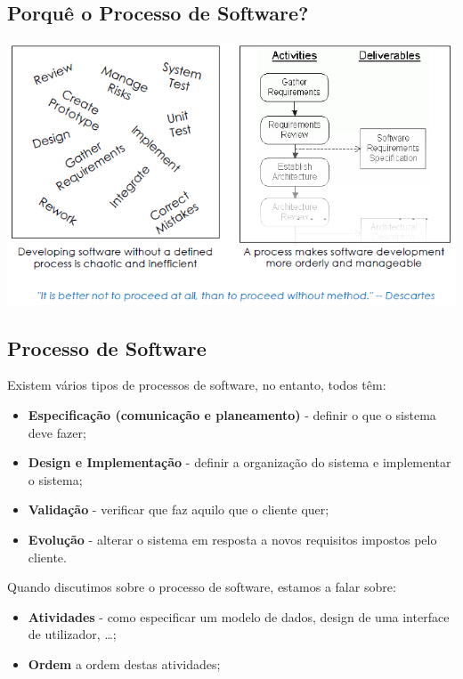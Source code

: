 \documentclass{article}
\begin{document}
\subsection{Porquê o Processo de Software?}

\begin{center}
  \includegraphics[scale=0.6]{9}
\end{center}

\subsection{Processo de Software}

Existem vários tipos de processos de software, no entanto, todos têm:

\begin{itemize}
  \item \textbf{Especificação (comunicação e planeamento)} - definir o que o sistema deve fazer;
  \item \textbf{Design e Implementação} - definir a organização do sistema e implementar o sistema;
  \item \textbf{Validação} - verificar que faz aquilo que o cliente quer;
  \item \textbf{Evolução} - alterar o sistema em resposta a novos requisitos impostos pelo cliente.
\end{itemize}


Quando discutimos sobre o processo de software, estamos a falar sobre:
\begin{itemize}
  \item \textbf{Atividades} - como especificar um modelo de dados, design de uma
  interface de utilizador, \dots;
  \item \textbf{Ordem} a ordem destas atividades;
\end{itemize}
\end{document}
